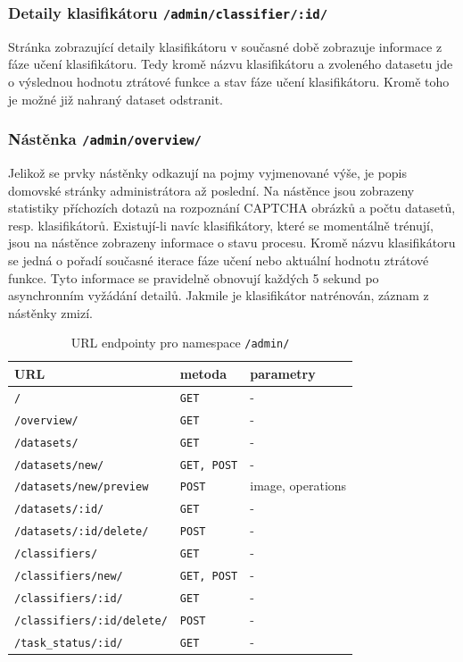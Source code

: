 \documentclass[
  master=true,
  biblatex,
  glossaries,
  index
]{kidiplom}
\begin{document}
\subsubsection*{Detaily klasifikátoru \texttt{/admin/classifier/:id/}}
Stránka zobrazující detaily klasifikátoru v současné době zobrazuje informace z fáze učení klasifikátoru. Tedy kromě názvu klasifikátoru a zvoleného datasetu jde o výslednou hodnotu ztrátové funkce a stav fáze učení klasifikátoru. Kromě toho je možné již nahraný dataset odstranit.

\subsubsection*{Nástěnka \texttt{/admin/overview/}}
Jelikož se prvky nástěnky odkazují na pojmy vyjmenované výše, je popis domovské stránky administrátora až poslední. Na nástěnce jsou zobrazeny statistiky příchozích dotazů na rozpoznání CAPTCHA obrázků a počtu datasetů, resp. klasifikátorů. Existují-li navíc klasifikátory, které se momentálně trénují, jsou na nástěnce zobrazeny informace o stavu procesu. Kromě názvu klasifikátoru se jedná o pořadí současné iterace fáze učení nebo aktuální hodnotu ztrátové funkce. Tyto informace se pravidelně obnovují každých 5 sekund po asynchronním vyžádání detailů. Jakmile je klasifikátor natrénován, záznam z nástěnky zmizí.

\begin{table}[h]
\begin{tabular}{|l|l|l|}
\hline
\textbf{URL} & \textbf{metoda} & \textbf{parametry}
\\ \hline
\texttt{/} & \texttt{GET} & -
\\ \hline
\texttt{/overview/} & \texttt{GET} & -
\\ \hline
\texttt{/datasets/} & \texttt{GET} & -
\\ \hline
\texttt{/datasets/new/} & \texttt{GET, POST} & - 
\\ \hline
\texttt{/datasets/new/preview} & \texttt{POST} & image, operations
\\ \hline
\texttt{/datasets/:id/} & \texttt{GET} & -
\\ \hline
\texttt{/datasets/:id/delete/} & \texttt{POST} & -
\\ \hline
\texttt{/classifiers/} & \texttt{GET} & -
\\ \hline
\texttt{/classifiers/new/} & \texttt{GET, POST} & - 
\\ \hline
\texttt{/classifiers/:id/} & \texttt{GET} & -
\\ \hline
\texttt{/classifiers/:id/delete/} & \texttt{POST} & -
\\ \hline
\texttt{/task\_status/:id/} & \texttt{GET} & -
\\ \hline
\end{tabular}
\caption{URL endpointy pro namespace \texttt{/admin/}}
\end{table}
\end{document}
